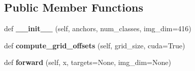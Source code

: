 \subsection*{Public Member Functions}
\begin{DoxyCompactItemize}
\item 
\mbox{\label{classmodels_1_1YOLOLayer_a5d21b10069a1f37da79133f305208092}} 
def {\bfseries \+\_\+\+\_\+init\+\_\+\+\_\+} (self, anchors, num\+\_\+classes, img\+\_\+dim=416)
\item 
\mbox{\label{classmodels_1_1YOLOLayer_a8d8aa963f89720bd2c63bbf6b7e44041}} 
def {\bfseries compute\+\_\+grid\+\_\+offsets} (self, grid\+\_\+size, cuda=True)
\item 
\mbox{\label{classmodels_1_1YOLOLayer_a805a94787bcd42bc5bf385f398e5e40d}} 
def {\bfseries forward} (self, x, targets=None, img\+\_\+dim=None)
\end{DoxyCompactItemize}
